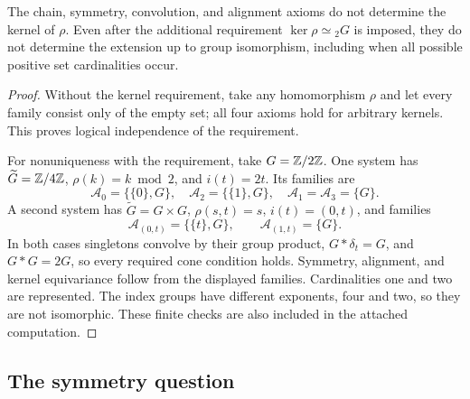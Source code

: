 \begin{proposition}\label{C-extension}
The chain, symmetry, convolution, and alignment axioms do not determine
the kernel of $\rho$. Even after the additional requirement
$\ker\rho\simeq{}_2G$ is imposed, they do not determine the extension up
to group isomorphism, including when all possible positive set cardinalities occur.
\end{proposition}
\begin{proof}
Without the kernel requirement, take any homomorphism $\rho$ and let
every family consist only of the empty set; all four axioms hold for
arbitrary kernels. This proves logical independence of the requirement.

For nonuniqueness with the requirement, take $G={\mathbb{Z}}/2{\mathbb{Z}}$. One system has
$\widetilde G={\mathbb{Z}}/4{\mathbb{Z}}$, $\rho(k)=k\bmod2$, and $i(t)=2t$.
Its families are
\[
 \mathcal A_0=\{\{0\},G\},\quad
 \mathcal A_2=\{\{1\},G\},\quad
 \mathcal A_1=\mathcal A_3=\{G\}.
\]
A second system has $\widetilde G=G\times G$, $\rho(s,t)=s$,
$i(t)=(0,t)$, and families
\[
 \mathcal A_{(0,t)}=\{\{t\},G\},\qquad
 \mathcal A_{(1,t)}=\{G\}.
\]
In both cases singletons convolve by their group product, $G*\delta_t=G$,
and $G*G=2G$, so every required cone condition holds. Symmetry, alignment,
and kernel equivariance follow from the displayed families. Cardinalities
one and two are represented. The index groups have different exponents,
four and two, so they are not isomorphic. These finite checks are also
included in the attached computation.
\end{proof}

\subsection{The symmetry question}

